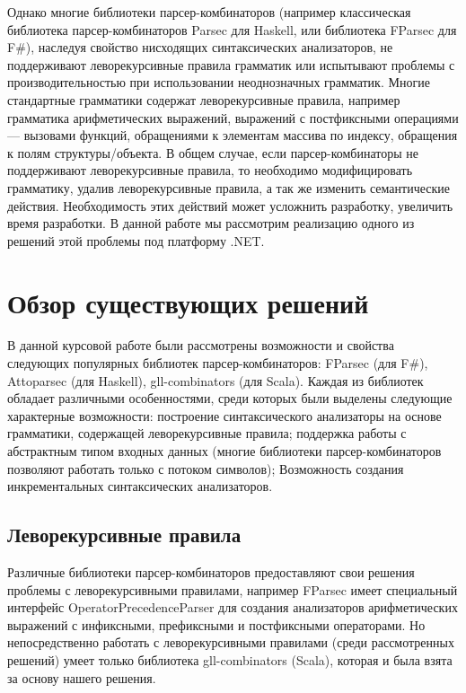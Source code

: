 \documentclass[14pt]{matmex-diploma}
\begin{document}
Однако многие библиотеки парсер-комбинаторов
  (например классическая библиотека парсер-комбинаторов Parsec \cite{LeijenMeijer:parsec} для Haskell, 
  или библиотека FParsec \cite{fparsec} для F\#), 
  наследуя свойство нисходящих синтаксических анализаторов,  
  не поддерживают леворекурсивные правила грамматик 
  или испытывают проблемы с производительностью
  при использовании неоднозначных грамматик. 
  Многие стандартные грамматики содержат леворекурсивные правила, например грамматика арифметических выражений, 
  выражений с постфиксными операциями --- вызовами функций,
  обращениями к элементам массива по индексу, 
обращения к полям структуры/объекта. В общем случае, если парсер-комбинаторы не поддерживают леворекурсивные правила, 
то необходимо модифицировать грамматику, удалив леворекурсивные правила, 
а так же изменить семантические действия. Необходимость этих действий может усложнить разработку, увеличить время разработки. В данной работе мы рассмотрим реализацию одного из решений этой проблемы под платформу .NET.


\section{Обзор существующих решений}

В данной курсовой работе были рассмотрены возможности и свойства следующих популярных библиотек парсер-комбинаторов: 
FParsec (для F\#), Attoparsec \cite{attoparsec} (для Haskell), gll-combinators \cite{gllcombinators} (для Scala). Каждая из библиотек обладает различными особенностями, среди которых были выделены следующие характерные возможности: 
построение синтаксического анализаторы на основе грамматики, содержащей леворекурсивные правила; 
  поддержка работы с абстрактным типом входных данных 
  (многие библиотеки парсер-комбинаторов позволяют работать только с потоком символов); 
  Возможность создания инкрементальных синтаксических анализаторов.

\subsection{Леворекурсивные правила}

Различные библиотеки парсер-комбинаторов предоставляют свои решения проблемы с леворекурсивными правилами, например FParsec имеет специальный интерфейс OperatorPrecedenceParser \cite{fparsec:opp} для создания анализаторов арифметических выражений с инфиксными, префиксными и постфиксными операторами. Но непосредственно работать с леворекурсивными правилами (среди рассмотренных решений) умеет только библиотека gll-combinators (Scala), которая и была взята за основу нашего решения.
\end{document}
